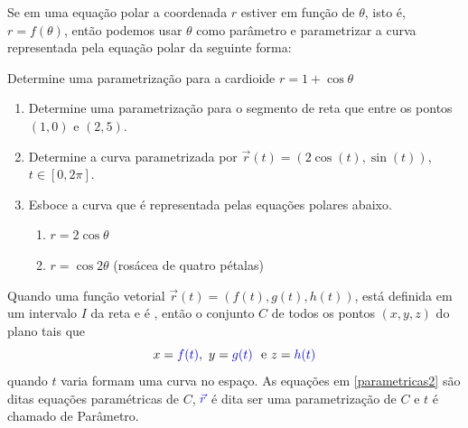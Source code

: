 Se em uma equação polar {\color{blue}a coordenada $r$ estiver em função de $\theta$}, isto é, {\color{blue}$r=f(\theta)$}, então podemos usar {\color{red}$\theta$ como parâmetro} e parametrizar a curva representada pela equação polar da seguinte forma:

\begin{center}
\end{center}

\begin{exeb}{}{}
Determine uma parametrização para a  cardioide $r=1+\cos \theta$

\end{exeb}



\vfill
\begin{casab}{}{}
\begin{enumerate}
\item  Determine uma parametrização para o segmento de reta que entre os pontos $(1,0)$ e $(2,5)$.
\item Determine a curva parametrizada por $\vec{r}(t)=(2\cos(t),\sin(t))$, $t\in [0,2\pi]$.
\item		Esboce a curva que é representada pelas equações polares abaixo.
\begin{enumerate}
\item $r=2\cos\theta$

\item $r=\cos 2\theta$ (rosácea de quatro pétalas)
\end{enumerate}
\end{enumerate}
\end{casab}
\newpage



Quando uma função vetorial {\color{blue}$\vec{r}(t)=(f(t),g(t),h(t))$}, está definida em um intervalo $I$ da reta e  é , então o conjunto {\color{red}$C$} de todos os pontos $(x,y,z)$ do plano tais que
\begin{equation}\label{parametricas2}
x={\color{blue}f(t)},\  y={\color{blue}g(t)}\ \text{ e } z={\color{blue}h(t)}
\end{equation}
quando $t$ varia formam uma {\color{red}curva no espaço}. As equações em  {\color{red} \eqref{parametricas2}} são ditas {\color{red} equações paramétricas de $C$}, ${\color{blue}\vec{r}}$ é dita ser uma {\color{red}parametrização de $C$} e $t$ é chamado de  {\color{red} Parâmetro}.

